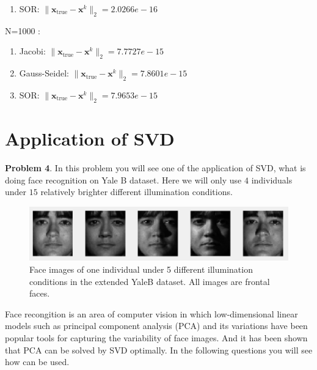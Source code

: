 \documentclass[english,onecolumn]{IEEEtran}
\begin{document}
\begin{enumerate}
\begin{enumerate}
	\item SOR: $\|\mathbf{x}_{\mathrm{true}} - \mathbf{x}^k\|_2=2.0266e-16$
\end{enumerate}
N=1000 :
\begin{enumerate}
	\item Jacobi: $\|\mathbf{x}_{\mathrm{true}} - \mathbf{x}^k\|_2=7.7727e-15$
	\item Gauss-Seidel: $\|\mathbf{x}_{\mathrm{true}} - \mathbf{x}^k\|_2=7.8601e-15$
	\item SOR: $\|\mathbf{x}_{\mathrm{true}} - \mathbf{x}^k\|_2=7.9653e-15$
\end{enumerate}
\end{enumerate}


\clearpage
\section{Application of SVD}
\noindent\textbf{Problem 4}.
In this problem you will see one of the application of SVD, what is doing face recognition on Yale B dataset. Here we will only use $4$ individuals under $15$ relatively brighter different illumination conditions.

\begin{figure}[h]
    \centering
    \includegraphics{figures/example_face.png}
    \caption{Face images of one individual under 5 different illumination conditions in the extended YaleB dataset. All images are frontal faces.}
    \label{fig:my_label}
\end{figure}
\vspace{-0.3cm}
Face recongition is an area of computer vision in which low-dimensional linear models such as principal component analysis (PCA) and its variations have been popular tools for capturing the variability of face images. And it has been shown that PCA can be solved by SVD optimally. In the following questions you will see how  can be used.
\end{document}
